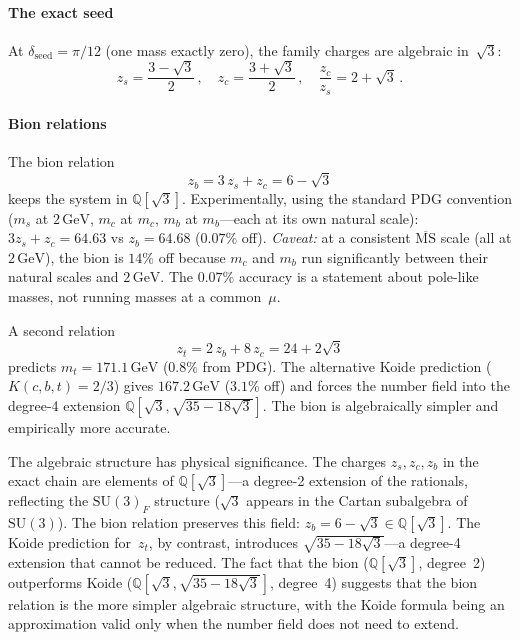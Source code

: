 \documentclass[aps,prd,twocolumn,showpacs,preprintnumbers,superscriptaddress]{revtex4-2}
\newcommand{\SU}{\mathrm{SU}}
\newcommand{\GeV}{\,\mathrm{GeV}}
\begin{document}
\paragraph{The exact seed}

At $\delta_{\mathrm{seed}} = \pi/12$ (one mass exactly
zero), the family charges are algebraic in~$\sqrt{3}$:
\begin{equation}
  z_s = \frac{3-\sqrt{3}}{2}\,,\quad
  z_c = \frac{3+\sqrt{3}}{2}\,,\quad
  \frac{z_c}{z_s} = 2 + \sqrt{3}\,.
  \label{eq:seed_charges}
\end{equation}

\paragraph{Bion relations}

The bion relation~\cite{Unsal:2008}
\begin{equation}
  z_b = 3\,z_s + z_c = 6 - \sqrt{3}
  \label{eq:bion1}
\end{equation}
keeps the system in $\mathbb{Q}[\sqrt{3}]$.
Experimentally, using the standard PDG convention
($m_s$ at $2\GeV$, $m_c$ at $m_c$, $m_b$ at $m_b$---each at
its own natural scale):
$3z_s + z_c = 64.63$ vs $z_b = 64.68$ ($0.07\%$ off).
\emph{Caveat:} at a consistent $\overline{\mathrm{MS}}$ scale
(all at $2\GeV$), the bion is $14\%$ off because $m_c$ and
$m_b$ run significantly between their natural scales and
$2\GeV$.
The $0.07\%$ accuracy is a statement about pole-like masses,
not running masses at a common~$\mu$.

A second relation
\begin{equation}
  z_t = 2\,z_b + 8\,z_c = 24 + 2\sqrt{3}
  \label{eq:bion2}
\end{equation}
predicts $m_t = 171.1\GeV$ ($0.8\%$ from PDG).
The alternative Koide prediction ($K(c,b,t) = 2/3$) gives
$167.2\GeV$ ($3.1\%$ off) and forces the number field into
the degree-4 extension
$\mathbb{Q}[\sqrt{3}, \sqrt{35 - 18\sqrt{3}}]$.
The bion is algebraically simpler and empirically more
accurate.

The algebraic structure has physical significance.
The charges $z_s, z_c, z_b$ in the exact chain
are elements of $\mathbb{Q}[\sqrt{3}]$---a degree-2
extension of the rationals, reflecting the $\SU(3)_F$
structure ($\sqrt{3}$ appears in the Cartan subalgebra
of~$\SU(3)$).
The bion relation preserves this field: $z_b = 6-\sqrt{3}
\in \mathbb{Q}[\sqrt{3}]$.
The Koide prediction for~$z_t$, by contrast, introduces
$\sqrt{35-18\sqrt{3}}$---a degree-4 extension that cannot
be reduced.
The fact that the bion ($\mathbb{Q}[\sqrt{3}]$, degree~2)
outperforms Koide ($\mathbb{Q}[\sqrt{3},\sqrt{35-18\sqrt{3}}]$,
degree~4) suggests that the bion relation is the more
simpler algebraic structure, with the Koide formula
being an approximation valid only when the number field
does not need to extend.
\end{document}
